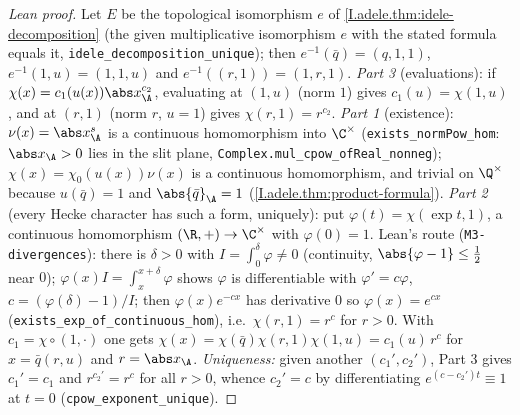 \begin{proof}[Lean proof]
Let $E$ be the topological isomorphism $e$ of \cref{I.adele.thm:idele-decomposition} (the given multiplicative isomorphism $e$ with the stated formula equals it, \texttt{idele\_decomposition\_unique}); then $e^{-1}(\bar q)=(q,1,1)$, $e^{-1}(1,u)=(1,1,u)$ and $e^{-1}((r,1))=(1,r,1)$. \emph{Part 3} (evaluations): if $\chi(x)=c_1(u(x))\abs x_\A^{c_2}$, evaluating at $(1,u)$ (norm $1$) gives $c_1(u)=\chi(1,u)$, and at $(r,1)$ (norm $r$, $u=1$) gives $\chi(r,1)=r^{c_2}$. \emph{Part 1} (existence): $\nu(x)=\abs x_\A^s$ is a continuous homomorphism into $\C^\times$ (\texttt{exists\_normPow\_hom}: $\abs x_\A>0$ lies in the slit plane, \texttt{Complex.mul\_cpow\_ofReal\_nonneg}); $\chi(x)=\chi_0(u(x))\nu(x)$ is a continuous homomorphism, and trivial on $\Q^\times$ because $u(\bar q)=1$ and $\abs{\bar q}_\A=1$ (\cref{I.adele.thm:product-formula}). \emph{Part 2} (every Hecke character has such a form, uniquely): put $\varphi(t)=\chi(\exp t,1)$, a continuous homomorphism $(\R,+)\to\C^\times$ with $\varphi(0)=1$. Lean's route (\texttt{M3-divergences}): there is $\delta>0$ with $I=\int_0^\delta\varphi\ne0$ (continuity, $\abs{\varphi-1}\le\tfrac12$ near $0$); $\varphi(x)I=\int_x^{x+\delta}\varphi$ shows $\varphi$ is differentiable with $\varphi'=c\varphi$, $c=(\varphi(\delta)-1)/I$; then $\varphi(x)e^{-cx}$ has derivative $0$ so $\varphi(x)=e^{cx}$ (\texttt{exists\_exp\_of\_continuous\_hom}), i.e.\ $\chi(r,1)=r^{c}$ for $r>0$. With $c_1=\chi\circ(1,\cdot)$ one gets $\chi(x)=\chi(\bar q)\chi(r,1)\chi(1,u)=c_1(u)\,r^c$ for $x=\bar q(r,u)$ and $r=\abs x_\A$. \emph{Uniqueness:} given another $(c_1',c_2')$, Part 3 gives $c_1'=c_1$ and $r^{c_2'}=r^{c}$ for all $r>0$, whence $c_2'=c$ by differentiating $e^{(c-c_2')t}\equiv1$ at $t=0$ (\texttt{cpow\_exponent\_unique}).
\end{proof}

